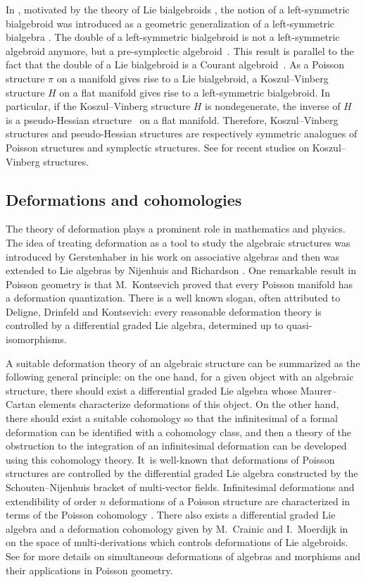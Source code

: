 \documentclass[pdftex]{sigma}%
\numberwithin{equation}{section}
\begin{document}
 In \cite{lsb2}, motivated by the theory of Lie bialgebroids \cite{Lie-bialgebroid}, the notion of a left-symmetric bialgebroid was introduced as a geometric generalization of a left-symmetric bialgebra \cite{Left-symmetric-bialgebras}. The double of a left-symmetric bialgebroid is not a left-symmetric algebroid anymore, but a pre-symplectic algebroid~\cite{lsb}. This result is parallel to the fact that
 the double of a Lie bialgebroid is a Courant algebroid~\cite{lwx}. As a Poisson structure $\pi$ on a manifold gives rise to a Lie bialgebroid, a Koszul--Vinberg structure $H$ on a flat manifold gives rise to a left-symmetric bialgebroid. In particular, if the Koszul--Vinberg structure $H$ is nondegenerate, the inverse of $H$ is a pseudo-Hessian structure~\cite{Shima,Geometry-of-Hessian-structures} on a flat manifold.
 Therefore, Koszul--Vinberg structures and pseudo-Hessian structures are respectively symmetric analogues of Poisson structures and symplectic structures. See \cite{ABB,BBo, WLS} for recent studies on Koszul--Vinberg structures.

 \subsection{Deformations and cohomologies}
The theory of deformation plays a prominent role in mathematics and physics.
The idea of treating deformation as a tool to study the algebraic structures was introduced by Gerstenhaber in his work on associative algebras \cite{Gerstenhaber2,Gerstenhaber1} and then was extended to Lie algebras by Nijenhuis and Richardson \cite{NR1,NR3}. One remarkable
result in Poisson geometry is that M.~Kontsevich \cite{Kon} proved that every Poisson manifold has a deformation quantization. There is a well known slogan, often attributed to Deligne, Drinfeld and Kontsevich: every reasonable deformation theory is controlled by a differential graded Lie algebra, determined up to quasi-isomorphisms.

A suitable deformation theory of an algebraic structure can be summarized as the following general principle: on the one hand, for a given object with an algebraic structure, there should exist a differential graded Lie algebra whose Maurer--Cartan elements characterize deformations of this object. On the other hand, there should exist a suitable cohomology so that the infinitesimal of a formal deformation can be identified with a cohomology class, and then a theory of the obstruction to the integration of an infinitesimal deformation can be developed using this cohomology theory. It~is well-known that deformations of Poisson structures are controlled by the differential graded Lie algebra constructed by the Schouten--Nijenhuis bracket of multi-vector fields. Infinitesimal deformations and extendibility of order $n$ deformations of a Poisson structure are characterized in terms of the Poisson cohomology \cite{Hue, Lic}. There also exists a differential graded Lie algebra and a deformation cohomology given by M.~Crainic and I.~Moerdijk in \cite{deformation-cohomology-LA} on the space of multi-derivations which controls deformations of Lie algebroids. See \cite{FZ1,FZ2} for more details on simultaneous deformations of algebras and morphisms and their applications in Poisson geometry.
\end{document}

